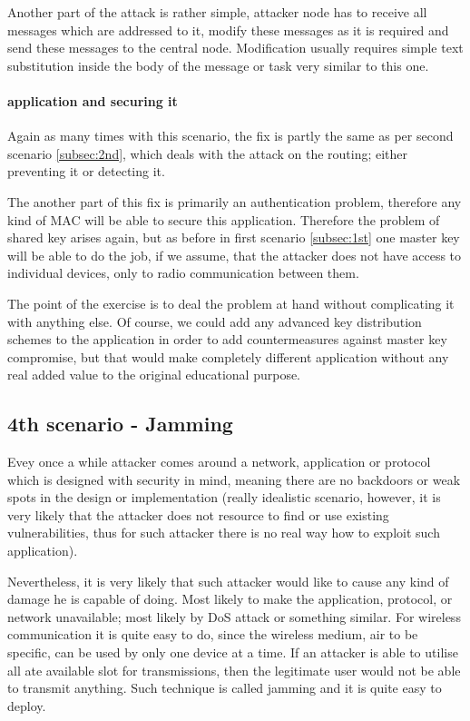\documentclass[
  digital, %
  table,   %
  nolof,     %
  nolot,     %
           oneside
]{fithesis3}
\begin{document}
    Another part of the attack is rather simple, attacker node has to receive all messages which are addressed to it, modify these messages as it is required and send these messages to the central node. Modification usually requires simple text substitution inside the body of the message or task very similar to this one.

    \paragraph{application and securing it}
    Again as many times with this scenario, the fix is partly the same as per second scenario \ref{subsec:2nd}, which deals with the attack on the routing; either preventing it or detecting it.

    The another part of this fix is primarily an authentication problem, therefore any kind of MAC will be able to secure this application. Therefore the problem of shared key arises again, but as before in first scenario \ref{subsec:1st} one master key will be able to do the job, if we assume, that the attacker does not have access to individual devices, only to radio communication between them.

    The point of the exercise is to deal the problem at hand without complicating it with anything else. Of course, we could add any advanced key distribution schemes  %
    to the application in order to add countermeasures against master key compromise, but that would make completely different application without any real added value to the original educational purpose.

    \subsection{4th scenario - Jamming} \label{subsec:4th}
    Evey once a while attacker comes around a network, application or protocol which is designed with security in mind, meaning there are no backdoors or weak spots in the design or implementation (really idealistic scenario, however, it is very likely that the attacker does not resource to find or use existing vulnerabilities, thus for such attacker there is no real way how to exploit such application).

    Nevertheless, it is very likely that such attacker would like to cause any kind of damage he is capable of doing. Most likely to make the application, protocol, or network unavailable; most likely by DoS attack %
    or something similar. For wireless communication it is quite easy to do, since the wireless medium, air to be specific, can be used by only one device at a time. If an attacker is able to utilise all ate available slot for transmissions, then the legitimate user would not be able to transmit anything. Such technique is called jamming and it is quite easy to deploy.
\end{document}
